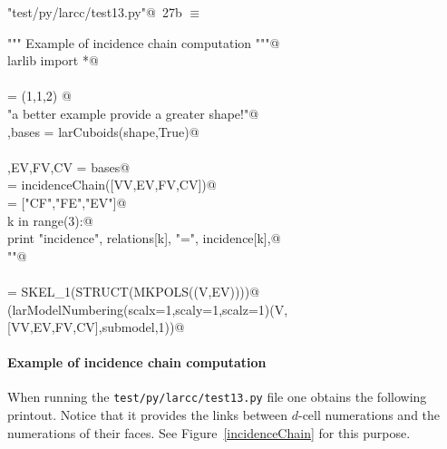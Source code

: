 \documentclass[11pt,oneside]{article}    %
\begin{document}
\begin{flushleft} \small \label{scrap45}
\protect{}\verb@"test/py/larcc/test13.py"@\nobreak\ {\footnotesize 27b }$\equiv$
\vspace{-1ex}
\begin{list}{}{} \item
\mbox{}\verb@""" Example of incidence chain computation """@\\
\mbox{}\verb@from larlib import *@\\
\mbox{}\verb@@\\
\mbox{}\verb@shape = (1,1,2) @\\
\mbox{}\verb@print "\n\nFor a better example provide a greater shape!"@\\
\mbox{}\verb@V,bases = larCuboids(shape,True)@\\
\mbox{}\verb@@\\
\mbox{}\verb@VV,EV,FV,CV = bases@\\
\mbox{}\verb@incidence = incidenceChain([VV,EV,FV,CV])@\\
\mbox{}\verb@relations = ["CF","FE","EV"]@\\
\mbox{}\verb@for k in range(3):@\\
\mbox{}\verb@    print "\n\n incidence", relations[k], "=\n", incidence[k],@\\
\mbox{}\verb@print "\n\n"@\\
\mbox{}\verb@@\\
\mbox{}\verb@submodel = SKEL_1(STRUCT(MKPOLS((V,EV))))@\\
\mbox{}\verb@VIEW(larModelNumbering(scalx=1,scaly=1,scalz=1)(V,[VV,EV,FV,CV],submodel,1))@\\
\mbox{}\verb@@{\NWsep}
\end{list}
\vspace{-2ex}
\end{flushleft}


\paragraph{Example of incidence chain computation}
When running the \texttt{test/py/larcc/test13.py} file one obtains the following printout. 
Notice that 
it provides the links between $d$-cell numerations and the numerations of their faces.
See Figure~\ref{incidenceChain} for this purpose.
\end{document}
